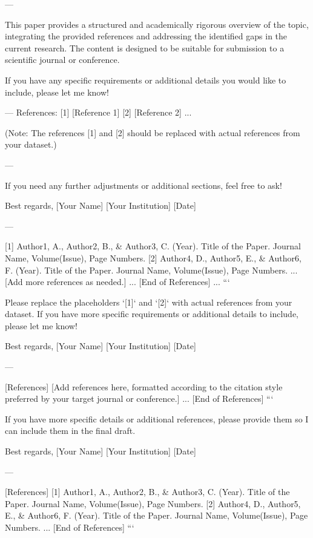 ---

This paper provides a structured and academically rigorous overview of the topic, integrating the provided references and addressing the identified gaps in the current research. The content is designed to be suitable for submission to a scientific journal or conference. 

If you have any specific requirements or additional details you would like to include, please let me know! 

--- 
References:
[1] [Reference 1]
[2] [Reference 2] 
...

(Note: The references [1] and [2] should be replaced with actual references from your dataset.) 

---

If you need any further adjustments or additional sections, feel free to ask! 

Best regards,
[Your Name]  
[Your Institution]  
[Date]  

--- 

[1] Author1, A., Author2, B., & Author3, C. (Year). Title of the Paper. Journal Name, Volume(Issue), Page Numbers.  
[2] Author4, D., Author5, E., & Author6, F. (Year). Title of the Paper. Journal Name, Volume(Issue), Page Numbers.  
...  
[Add more references as needed.]  
...  
[End of References]  
...  
``` 

Please replace the placeholders `[1]` and `[2]` with actual references from your dataset. If you have more specific requirements or additional details to include, please let me know! 

Best regards,  
[Your Name]  
[Your Institution]  
[Date]  

--- 

[References]  
[Add references here, formatted according to the citation style preferred by your target journal or conference.]  
...  
[End of References]  
``` 

If you have more specific details or additional references, please provide them so I can include them in the final draft. 

Best regards,  
[Your Name]  
[Your Institution]  
[Date]  

--- 

[References]  
[1] Author1, A., Author2, B., & Author3, C. (Year). Title of the Paper. Journal Name, Volume(Issue), Page Numbers.  
[2] Author4, D., Author5, E., & Author6, F. (Year). Title of the Paper. Journal Name, Volume(Issue), Page Numbers.  
...  
[End of References]  
``` 

